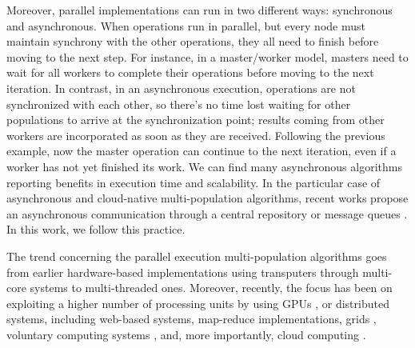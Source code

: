 \documentclass[review]{elsarticle}
\begin{document}
Moreover, parallel implementations can run in two different ways: synchronous and
asynchronous. When operations run in parallel, but every node must maintain synchrony with
the other operations, they all need to finish before moving to the next
step. For instance, in a  master/worker model, masters need to wait for all
workers to complete their operations before moving to the next iteration.  In
contrast, in an asynchronous execution,  operations are not synchronized with
each other, so there's no time lost waiting for other populations to
arrive at the synchronization point; results coming from other workers are 
incorporated as soon as they are received. Following the previous example, now the master operation can
continue to the next iteration, even if a worker has not yet finished its work. 
We can find many asynchronous algorithms
\cite{coleman89,baugh2003asynchronous} reporting benefits in execution time
and scalability. In the particular case of asynchronous and cloud-native
multi-population algorithms, recent works propose an asynchronous communication
through a central repository \cite{sofea:cec2012, JSON} or message queues
\cite{salza2019speed, guervos2018introducing}. In this work, we follow this
practice.

The trend concerning the parallel execution multi-population algorithms goes from
earlier hardware-based implementations using transputers
\cite{gorges1990explicit} through 
multi-core systems \cite{Serrano2008,lai2019adaptive} to multi-threaded \cite{merelo2019scaling} ones.
Moreover, recently, the focus has been on exploiting a higher number of processing
units by using GPUs \cite{tan2015survey,li2007efficient}, or distributed
systems, including web-based \cite{JSON} systems,
map-reduce \cite{fazenda2012} implementations,  grids \cite{munawar2010design,Gonzalez09},
voluntary computing systems \cite{MilkyWay,merelo2016nodio}, 
and, more importantly, cloud computing
\cite{GValdez2015,salza2019speed,valenzuela2015implementing,FlexGP}.
\end{document}
